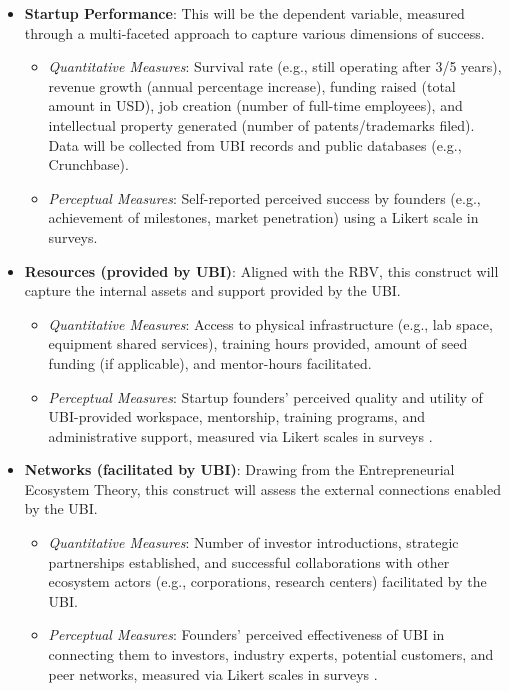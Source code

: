 \documentclass[../Main.tex]{subfiles}
\begin{document}
\begin{itemize}
    \item \textbf{Startup Performance}: This will be the dependent variable, measured through a multi-faceted approach to capture various dimensions of success.
    \begin{itemize}
        \item \textit{Quantitative Measures}: Survival rate (e.g., still operating after 3/5 years), revenue growth (annual percentage increase), funding raised (total amount in USD), job creation (number of full-time employees), and intellectual property generated (number of patents/trademarks filed). Data will be collected from UBI records and public databases (e.g., Crunchbase).
        \item \textit{Perceptual Measures}: Self-reported perceived success by founders (e.g., achievement of milestones, market penetration) using a Likert scale in surveys.
    \end{itemize}
    \item \textbf{Resources (provided by UBI)}: Aligned with the RBV, this construct will capture the internal assets and support provided by the UBI.
    \begin{itemize}
        \item \textit{Quantitative Measures}: Access to physical infrastructure (e.g., lab space, equipment shared services), training hours provided, amount of seed funding (if applicable), and mentor-hours facilitated.
        \item \textit{Perceptual Measures}: Startup founders' perceived quality and utility of UBI-provided workspace, mentorship, training programs, and administrative support, measured via Likert scales in surveys \cite{mian1996assessing}.
    \end{itemize}
    \item \textbf{Networks (facilitated by UBI)}: Drawing from the Entrepreneurial Ecosystem Theory, this construct will assess the external connections enabled by the UBI.
    \begin{itemize}
        \item \textit{Quantitative Measures}: Number of investor introductions, strategic partnerships established, and successful collaborations with other ecosystem actors (e.g., corporations, research centers) facilitated by the UBI.
        \item \textit{Perceptual Measures}: Founders' perceived effectiveness of UBI in connecting them to investors, industry experts, potential customers, and peer networks, measured via Likert scales in surveys \cite{theodorakopoulos2014business, harper2018makes}.

\end{itemize}
\end{itemize}
\end{document}
